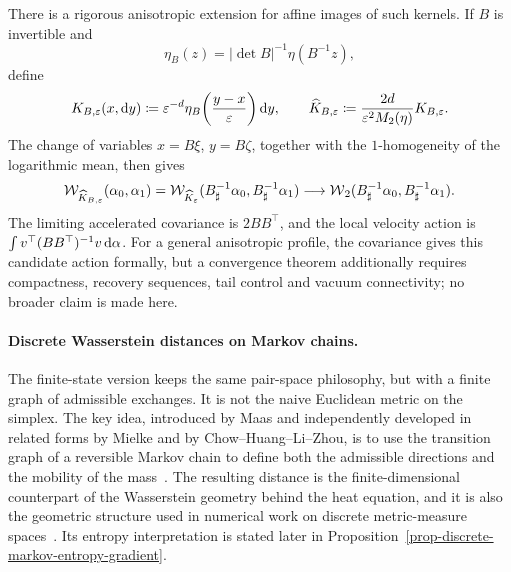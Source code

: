 There is a rigorous anisotropic extension for affine images of such kernels. If $B$ is invertible and
\[
	\eta_B(z)=|\det B|^{-1}\eta(B^{-1}z),
\]
define
\[
	K_{B,\varepsilon}(x,\mathrm{d} y)
	\coloneqq
	\varepsilon^{-d}\eta_B\!\left(\frac{y-x}{\varepsilon}\right)\mathrm{d} y,
	\qquad
	\widehat K_{B,\varepsilon}
	\coloneqq
	\frac{2d}{\varepsilon^2M_2(\eta)}K_{B,\varepsilon}.
\]
The change of variables $x=B\xi$, $y=B\zeta$, together with the $1$-homogeneity of the logarithmic mean, then gives
\[
	\mathcal W_{\widehat K_{B,\varepsilon}}(\alpha_0,\alpha_1)
	=
	\mathcal W_{\widehat K_\varepsilon}(B^{-1}_\sharp\alpha_0,B^{-1}_\sharp\alpha_1)
	\longrightarrow
	\operatorname{\mathcal{W}}_2(B^{-1}_\sharp\alpha_0,B^{-1}_\sharp\alpha_1).
\]
The limiting accelerated covariance is $2BB^\top$, and the local velocity action is $\int v^\top(BB^\top)^{-1}v\,\mathrm{d}\alpha$. For a general anisotropic profile, the covariance gives this candidate action formally, but a convergence theorem additionally requires compactness, recovery sequences, tail control and vacuum connectivity; no broader claim is made here.

\paragraph{Discrete Wasserstein distances on Markov chains.}\label{sec-discrete-wasserstein-markov}

The finite-state version keeps the same pair-space philosophy, but with a finite graph of admissible exchanges. It is not the naive Euclidean metric on the simplex. The key idea, introduced by Maas and independently developed in related forms by Mielke and by Chow--Huang--Li--Zhou, is to use the transition graph of a reversible Markov chain to define both the admissible directions and the mobility of the mass~\cite{Maas2011,MielkeCVPDE,ChowHuangLiZhou2012}. The resulting distance is the finite-dimensional counterpart of the Wasserstein geometry behind the heat equation, and it is also the geometric structure used in numerical work on discrete metric-measure spaces~\cite{ErbarDCDS,erbar2017computation}. Its entropy interpretation is stated later in Proposition~\ref{prop-discrete-markov-entropy-gradient}.


